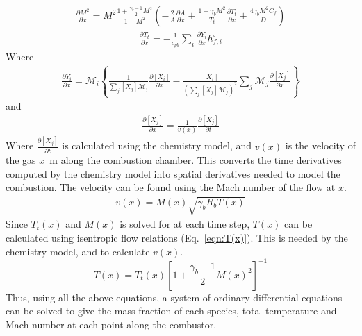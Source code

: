 \documentclass[a4paper]{article}
\begin{document}
\begin{align}\label{eqn:dM2dx}
    \frac{\partial M^2}{\partial x} =M^2 \frac{1 + \frac{\gamma_b - 1}{2}M^2}{1-M^2}\left( -\frac{2}{A} \frac{\partial A}{\partial x} + \frac{1 + \gamma_b M^2}{T_t}\frac{\partial T_t}{\partial x} + \frac{4 \gamma_b M^2 C_f}{D}\right)
\end{align}
\begin{align}\label{eqn:dTtdx}
    \frac{\partial T_t}{\partial x} = - \frac{1}{c_{pb}}\sum_i \frac{\partial Y_i}{\partial x}h_{f,i}^\circ
\end{align}
Where
\begin{align}\label{eqn:spatial_mass_fraction_gradient}
    \frac{\partial Y_i}{\partial x} = \mathcal{M}_i \left\lbrace \frac{1}{\sum_j \left[X_j\right]\mathcal{M}_j} \frac{\partial \left[X_i\right]}{\partial x} - \frac{\left[ X_i \right]}{\left(\sum_j \left[X_j\right]\mathcal{M}_j \right)^2 }\sum_j \mathcal{M}_j\frac{\partial \left[ X_j \right]}{\partial x} \right\rbrace
\end{align}
and 
\begin{align}\label{eqn:spatial_concentratoin_gradient}
    \frac{\partial \left[X_j\right]}{\partial x} = \frac{1}{v(x)}\frac{\partial \left[X_j\right]}{\partial t}
\end{align}
Where \(\frac{\partial \left[X_j\right]}{\partial t}\) is calculated using the chemistry model, and \(v(x)\) is the velocity of the gas \(x\)~m along the combustion chamber. This converts the time derivatives computed by the chemistry model into spatial derivatives needed to model the combustion. The velocity can be found using the Mach number of the flow at \(x\).
\begin{align}\label{eqn:v(x)}
    v(x) = M(x) \sqrt{\gamma_b R_b T(x)}
\end{align}
Since \(T_t(x)\) and \(M(x)\) is solved for at each time step, \(T(x)\) can be calculated using isentropic flow relations (Eq.~\ref{eqn:T(x)}). This is needed by the chemistry model, and to calculate \(v(x)\).
\begin{equation}\label{eqn:T(x)}
    T(x) = T_t(x) \left[ 1 + \frac{\gamma_b  - 1}{2}M(x)^2 \right]^{-1}
\end{equation}
Thus, using all the above equations, a system of ordinary differential equations can be solved to give the mass fraction of each species, total temperature and Mach number at each point along the combustor.
\end{document}
